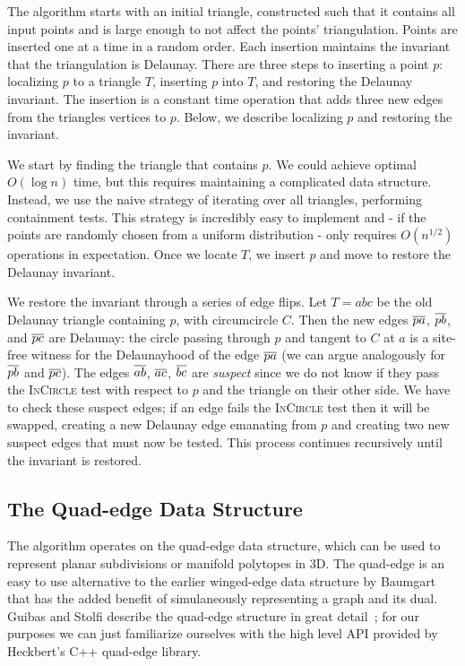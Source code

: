 The algorithm starts with an initial triangle, constructed such that it contains
all input points and is large enough to not affect the points' triangulation.
Points are inserted one at a time in a random order. Each insertion maintains
the invariant that the triangulation is Delaunay. There are three steps to
inserting a point $p$: localizing $p$ to a triangle $T$, inserting $p$ into
$T$, and restoring the Delaunay invariant. The insertion is a constant time
operation that adds three new edges from the triangles vertices to $p$. Below,
we describe localizing $p$ and restoring the invariant.

We start by finding the triangle that contains $p$. We could achieve optimal
$O(\log n)$ time, but this requires maintaining a complicated data structure.
Instead, we use the naive strategy of iterating over all triangles,
performing containment tests.  This strategy is incredibly easy to implement and 
- if the points are randomly chosen from a uniform distribution - only requires
$O(n^{1/2})$ operations in expectation. Once we locate $T$, we insert $p$ and
move to restore the Delaunay invariant.

We restore the invariant through a series of edge flips. Let $T = abc$ be the
old Delaunay triangle containing $p$, with circumcircle $C$. Then the new edges
$\seg{pa}$, $\seg{pb}$, and $\seg{pc}$ are Delaunay: the circle passing through
$p$ and tangent to $C$ at $a$ is a site-free witness for the Delaunayhood of the
edge $\seg{pa}$ (we can argue analogously for $\seg{pb}$ and $\seg{pc}$). The
edges $\seg{ab}$, $\seg{ac}$, $\seg{bc}$ are {\em suspect} since we do not know
if they pass the \textsc{InCircle} test with respect to $p$ and the triangle on
their other side. We have to check these suspect edges; if an edge fails the
\textsc{InCircle} test then it will be swapped, creating a new Delaunay edge
emanating from $p$ and creating two new suspect edges that must now be tested.
This process continues recursively until the invariant is restored.


\FloatBarrier
\subsection{The Quad-edge Data Structure}

The algorithm operates on the quad-edge data structure, which can be used to
represent planar subdivisions or manifold polytopes in 3D. The quad-edge is an
easy to use alternative to the earlier winged-edge data structure by
Baumgart~\cite{baumgart1975polyhedron} that has the added benefit of
simulaneously representing a graph and its dual.
Guibas and Stolfi describe the quad-edge structure in great
detail~\cite{guibas1985primitives}; for our purposes we can just familiarize
ourselves with the high level API provided by Heckbert's C++ quad-edge library.

